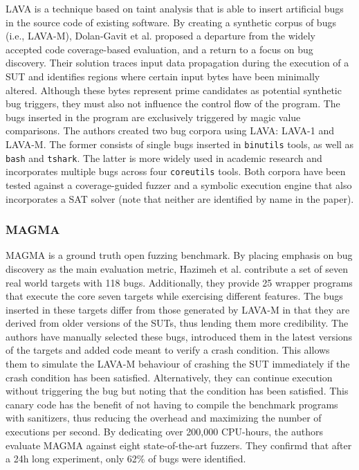 LAVA \cite{dolan2016lava} is a technique based on taint analysis that is able to insert artificial bugs in the source code of existing software. By creating a synthetic corpus of bugs (i.e., LAVA-M), Dolan-Gavit et al. proposed a departure from the widely accepted code coverage-based evaluation, and a return to a focus on bug discovery. Their solution traces input data propagation during the execution of a SUT and identifies regions where certain input bytes have been minimally altered. Although these bytes represent prime candidates as potential synthetic bug triggers, they must also not influence the control flow of the program. The bugs inserted in the program are exclusively triggered by magic value comparisons. The authors created two bug corpora using LAVA: LAVA-1 and LAVA-M. The former consists of single bugs inserted in \texttt{binutils} tools, as well as \texttt{bash} and \texttt{tshark}. The latter is more widely used in academic research and incorporates multiple bugs across four \texttt{coreutils} tools. Both corpora have been tested against a coverage-guided fuzzer and a symbolic execution engine that also incorporates a SAT solver (note that neither are identified by name in the paper).

\subsubsection{MAGMA}
\label{extend:netfuzz:benchmarks:magma}

MAGMA \cite{hazimeh2020magma} is a ground truth open fuzzing benchmark. By placing emphasis on bug discovery as the main evaluation metric, Hazimeh et al. contribute a set of seven real world targets with 118 bugs. Additionally, they provide 25 wrapper programs that execute the core seven targets while exercising different features. The bugs inserted in these targets differ from those generated by LAVA-M in that they are derived from older versions of the SUTs, thus lending them more credibility. The authors have manually selected these bugs, introduced them in the latest versions of the targets and added code meant to verify a crash condition. This allows them to simulate the LAVA-M behaviour of crashing the SUT immediately if the crash condition has been satisfied. Alternatively, they can continue execution without triggering the bug but noting that the condition has been satisfied. This canary code has the benefit of not having to compile the benchmark programs with sanitizers, thus reducing the overhead and maximizing the number of executions per second. By dedicating over 200,000 CPU-hours, the authors evaluate MAGMA against eight state-of-the-art fuzzers. They confirmd that after a 24h long experiment, only 62\% of bugs were identified.

